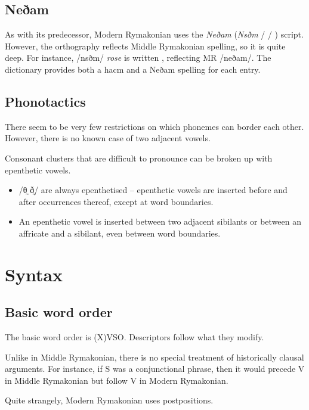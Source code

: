 \documentclass{book}
\newcommand{\lname}{Modern Rymakonian}
\begin{document}
\section{Neðam}

As with its predecessor, \lname{} uses the \emph{Neðam} (\emph{Nsðm} /  / ) script. However, the orthography reflects Middle Rymakonian spelling, so it is quite deep. For instance,  /nsðm/ \emph{rose} is written , reflecting MR  /neðam/. The dictionary provides both a hacm and a Neðam spelling for each entry.

\section{Phonotactics}

There seem to be very few restrictions on which phonemes can border each other. However, there is no known case of two adjacent vowels.

Consonant clusters that are difficult to pronounce can be broken up with epenthetic vowels.

\begin{itemize}
  \item /θ̼ ð̼/ are always epenthetised -- epenthetic vowels are inserted before and after occurrences thereof, except at word boundaries.
  \item An epenthetic vowel is inserted between two adjacent sibilants or between an affricate and a sibilant, even between word boundaries.
\end{itemize}

\chapter{Syntax}

\section{Basic word order}

The basic word order is (X)VSO. Descriptors follow what they modify.

Unlike in Middle Rymakonian, there is no special treatment of historically clausal arguments. For instance, if S was a conjunctional phrase, then it would precede V in Middle Rymakonian but follow V in Modern Rymakonian.

Quite strangely, \lname{} uses postpositions.
\end{document}
